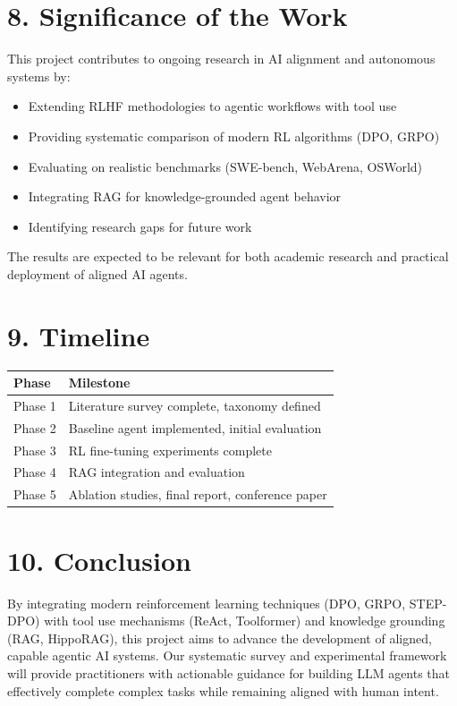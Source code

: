 \documentclass[12pt]{article}
\begin{document}
\section*{8. Significance of the Work}

This project contributes to ongoing research in AI alignment and autonomous systems by:
\begin{itemize}
    \item Extending RLHF methodologies to agentic workflows with tool use
    \item Providing systematic comparison of modern RL algorithms (DPO, GRPO)
    \item Evaluating on realistic benchmarks (SWE-bench, WebArena, OSWorld)
    \item Integrating RAG for knowledge-grounded agent behavior
    \item Identifying research gaps for future work
\end{itemize}

The results are expected to be relevant for both academic research and practical deployment of aligned AI agents.

\section*{9. Timeline}

\begin{table}[h]
\centering
\begin{tabular}{@{}ll@{}}
\toprule
\textbf{Phase} & \textbf{Milestone} \\
\midrule
Phase 1 & Literature survey complete, taxonomy defined \\
Phase 2 & Baseline agent implemented, initial evaluation \\
Phase 3 & RL fine-tuning experiments complete \\
Phase 4 & RAG integration and evaluation \\
Phase 5 & Ablation studies, final report, conference paper \\
\bottomrule
\end{tabular}
\end{table}

\section*{10. Conclusion}

By integrating modern reinforcement learning techniques (DPO, GRPO, STEP-DPO) with tool use mechanisms (ReAct, Toolformer) and knowledge grounding (RAG, HippoRAG), this project aims to advance the development of aligned, capable agentic AI systems. Our systematic survey and experimental framework will provide practitioners with actionable guidance for building LLM agents that effectively complete complex tasks while remaining aligned with human intent.
\end{document}
